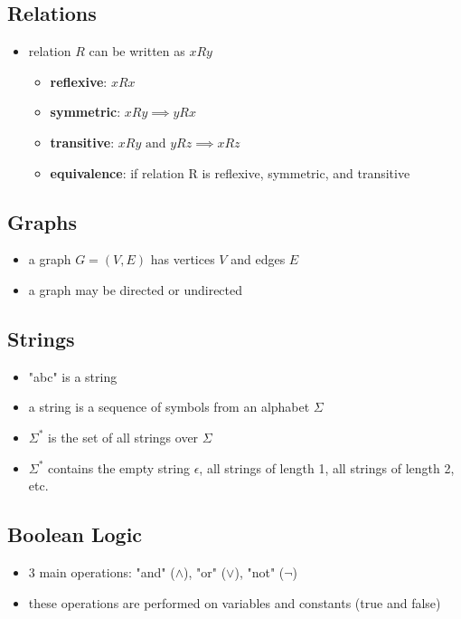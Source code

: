 \documentclass[11pt,a4paper]{article}
\begin{document}
\subsection{Relations}
\begin{itemize}
    \item relation $R$ can be written as $xRy$
    \begin{itemize}
        \item \textbf{reflexive}: $xRx$
        \item \textbf{symmetric}: $xRy \implies yRx$
        \item \textbf{transitive}: $xRy \text{ and } yRz \implies xRz$
        \item \textbf{equivalence}: if relation R is reflexive, symmetric, and transitive
    \end{itemize}
\end{itemize}

\subsection{Graphs}
\begin{itemize}
    \item a graph $G=(V,E)$ has vertices $V$ and edges $E$
    \item a graph may be directed or undirected
\end{itemize}

\subsection{Strings}
\begin{itemize}
    \item "abc" is a string
    \item a string is a sequence of symbols from an alphabet $\Sigma$
    \item $\Sigma^*$ is the set of all strings over $\Sigma$
    \item $\Sigma^*$ contains the empty string $\epsilon$, all strings of length 1, all strings of length 2, etc.
\end{itemize}

\subsection{Boolean Logic}
\begin{itemize}
    \item 3 main operations: "and" ($\land$), "or" ($\lor$), "not" ($\lnot$)
    \item these operations are performed on variables and constants (true and false)
\end{itemize}
\end{document}
